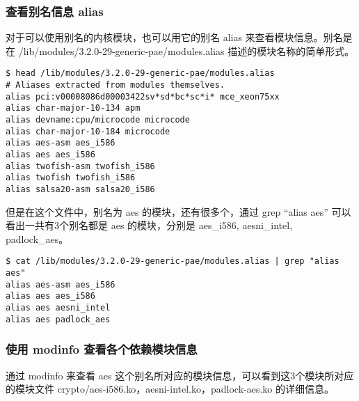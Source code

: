 \documentclass[11pt,a4paper]{article}
\begin{document}
\subsubsection{查看别名信息 alias}

对于可以使用别名的内核模块，也可以用它的别名 alias
来查看模块信息。别名是在 /lib/modules/3.2.0-29-generic-pae/modules.alias
描述的模块名称的简单形式。

{\begin{shaded}\begin{verbatim}
$ head /lib/modules/3.2.0-29-generic-pae/modules.alias
# Aliases extracted from modules themselves.
alias pci:v00008086d00003422sv*sd*bc*sc*i* mce_xeon75xx
alias char-major-10-134 apm
alias devname:cpu/microcode microcode
alias char-major-10-184 microcode
alias aes-asm aes_i586
alias aes aes_i586
alias twofish-asm twofish_i586
alias twofish twofish_i586
alias salsa20-asm salsa20_i586
\end{verbatim}\end{shaded}}
但是在这个文件中，别名为 aes 的模块，还有很多个，通过 grep ``alias aes''
可以看出一共有3个别名都是 aes 的模块，分别是 aes\_i586, aesni\_intel,
padlock\_aes。

{\begin{shaded}\begin{verbatim}
$ cat /lib/modules/3.2.0-29-generic-pae/modules.alias | grep "alias aes"
alias aes-asm aes_i586
alias aes aes_i586
alias aes aesni_intel
alias aes padlock_aes
\end{verbatim}\end{shaded}}
\subsubsection{使用 modinfo 查看各个依赖模块信息}

通过 modinfo 来查看 aes
这个别名所对应的模块信息，可以看到这3个模块所对应的模块文件
crypto/aes-i586.ko，aesni-intel.ko，padlock-aes.ko 的详细信息。
\end{document}
